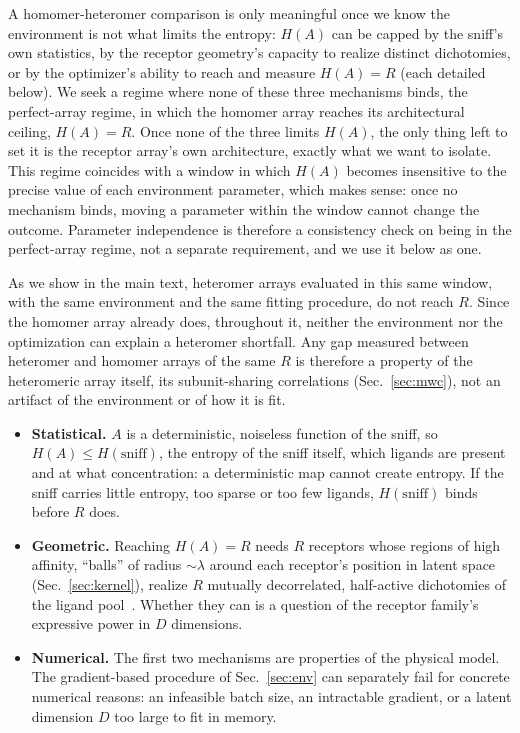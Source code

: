 \documentclass[aps,pre,superscriptaddress,floatfix,longbibliography,linenumbers]{revtex4-2}
\begin{document}
A homomer-heteromer comparison is only meaningful once we know the
environment is not what limits the entropy: $H(A)$ can be capped by the
sniff's own statistics, by the receptor geometry's capacity to realize
distinct dichotomies, or by the optimizer's ability to reach and measure
$H(A)=R$ (each detailed below). We seek a regime where none of these three
mechanisms binds, the perfect-array regime, in which the homomer array
reaches its architectural ceiling, $H(A)=R$. Once none of the three limits
$H(A)$, the only thing left to set it is the receptor array's own
architecture, exactly what we want to isolate. This regime coincides with
a window in which $H(A)$ becomes insensitive to the precise value of each
environment parameter, which makes sense: once no mechanism binds, moving
a parameter within the window cannot change the outcome. Parameter
independence is therefore a consistency check on being in the
perfect-array regime, not a separate requirement, and we use it below as
one.

As we show in the main text, heteromer arrays evaluated in this same
window, with the same environment and the same fitting procedure, do not
reach $R$. Since the homomer array already does, throughout it, neither
the environment nor the optimization can explain a heteromer shortfall.
Any gap measured between heteromer and homomer arrays of the same $R$ is
therefore a property of the heteromeric array itself, its subunit-sharing
correlations (Sec.~\ref{sec:mwc}), not an artifact of the environment or of
how it is fit.

\begin{itemize}
\item \textbf{Statistical.} $A$ is a deterministic, noiseless function of
the sniff, so $H(A)\le H(\text{sniff})$, the entropy of the sniff itself,
which ligands are present and at what concentration: a deterministic map
cannot create entropy. If the sniff carries little entropy, too sparse or
too few ligands, $H(\text{sniff})$ binds before $R$ does.
\item \textbf{Geometric.} Reaching $H(A)=R$ needs $R$ receptors whose
regions of high affinity, ``balls'' of radius $\sim\lambda$ around each
receptor's position in latent space (Sec.~\ref{sec:kernel}), realize $R$
mutually decorrelated, half-active dichotomies of the ligand
pool~\cite{zwicker_receptor_2016}. Whether they can is a question of the
receptor family's expressive power in $D$ dimensions.
\item \textbf{Numerical.} The first two mechanisms are properties of the
physical model. The gradient-based procedure of Sec.~\ref{sec:env} can
separately fail for concrete numerical reasons: an infeasible batch size,
an intractable gradient, or a latent dimension $D$ too large to fit in
memory.
\end{itemize}
\end{document}
